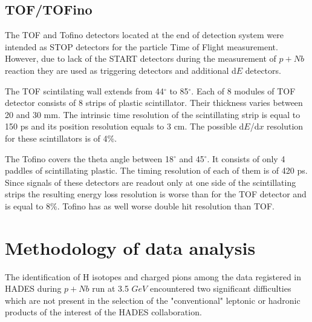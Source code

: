 \subsection{TOF/TOFino}
The TOF and Tofino detectors located at the end of detection system were intended 
as STOP detectors for the particle Time of Flight measurement. 
However, due to lack of the START detectors during the measurement of $p+Nb$ reaction 
they are used as triggering detectors and additional d$E$ detectors.

The TOF scintilating wall extends from 44$^{\circ}$ to 85$^{\circ}$. Each 
of 8 modules of TOF detector consists of 8 strips of plastic scintillator. 
Their thickness varies between 20 and 30 mm. The intrinsic time resolution 
of the scintillating strip is equal to 150 ps and its position resolution equals 
to 3 cm. The possible d$E$/d$x$ resolution for these scintillators is of 4\%.

The Tofino covers the theta angle between 18$^{\circ}$ and 45$^{\circ}$. 
It consists of only 4 paddles of scintillating plastic. The timing resolution of each of them is of 420 ps. 
Since signals of these detectors are readout only at one side of the scintillating strips 
the resulting energy loss resolution is worse than for the TOF detector and is equal 
to 8\%. Tofino has as well worse double hit resolution than TOF.

\section{Methodology of data analysis}
The identification of H isotopes and charged pions among the data registered in HADES during $p+Nb$ run at 3.5 $GeV$ encountered two significant difficulties which are not present in the selection of the "conventional" leptonic or hadronic products of the interest of the HADES collaboration.

